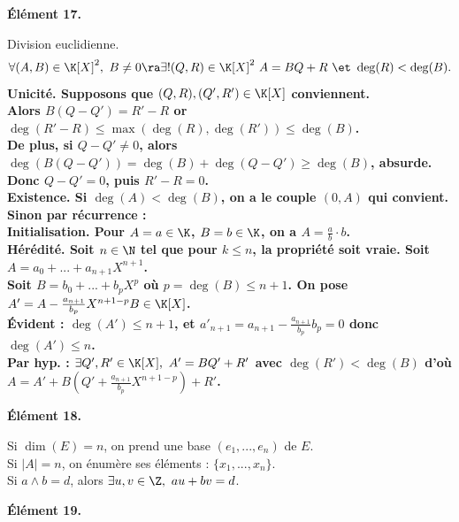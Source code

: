 \documentclass[11pt]{article}
\begin{document}
\begin{center}
    \bf{Élément 17.}
\end{center}

\begin{prop}{Division euclidienne.}{}
    \begin{equation*}
        \forall (A,B) \in \K[X]^2, ~ B\neq0 \ra \exists!(Q,R) \in \K[X]^2 ~ A = BQ + R ~\et~ \deg(R) < \deg(B).
    \end{equation*}
    \tcblower
    \bf{Unicité.} Supposons que $(Q,R),(Q',R')\in\K[X]$ conviennent.\\
    Alors $B(Q-Q')=R'-R$ or $\deg(R'-R)\leq\max(\deg(R),\deg(R'))\leq\deg(B)$.\\
    De plus, si $Q-Q'\neq0$, alors $\deg(B(Q-Q'))=\deg(B)+\deg(Q-Q')\geq\deg(B)$, absurde.\\
    Donc $Q-Q'=0$, puis $R'-R=0$.\\
    \bf{Existence.} Si $\deg(A)<\deg(B)$, on a le couple $(0,A)$ qui convient. Sinon par récurrence :\\
    \bf{Initialisation.} Pour $A=a\in\K$, $B=b\in\K$, on a $A=\frac{a}{b}\cdot b$.\\
    \bf{Hérédité.} Soit $n\in\N$ tel que pour $k\leq n$, la propriété soit vraie. Soit $A=a_0+...+a_{n+1}X^{n+1}$.\\
    Soit $B=b_0+...+b_pX^p$ où $p=\deg(B)\leq n+1$. On pose $A'=A-\frac{a_{n+1}}{b_p}X^{n+1-p}B\in\K[X]$.\\
    Évident : $\deg(A')\leq n+1$, et $a'_{n+1}=a_{n+1}-\frac{a_{n+1}}{b_p}b_p=0$ donc $\deg(A')\leq n$.\\
    Par hyp. : $\exists Q',R'\in\K[X], ~ A'=BQ'+R'$ avec $\deg(R')<\deg(B)$ d'où $A=A'+B(Q'+\frac{a_{n+1}}{b_p}X^{n+1-p})+R'$.
\end{prop}

\begin{center}
    \bf{Élément 18.}
\end{center}

\begin{rappel}{}{}
    Si $\dim(E)=n$, on prend une base $(e_1,...,e_n)$ de $E$.\\
    Si $|A|=n$, on énumère ses éléments : $\{x_1,...,x_n\}$.\\
    Si $a\land b = d$, alors $\exists u,v \in \Z, ~ au+bv=d$.
\end{rappel}

\pagebreak

\begin{center}
    \bf{Élément 19.}
\end{center}
\end{document}
